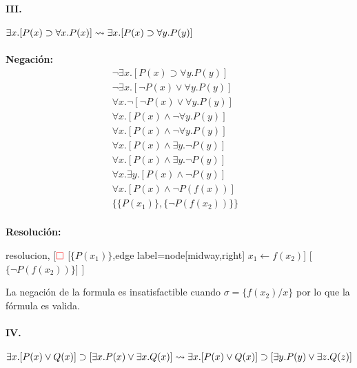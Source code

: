 \documentclass[10pt,a4paper]{article}
\begin{document}
\paragraph{III.} $\exists x. [P(x) \supset \forall x. P(x)] \underset{}{\overset{}{\leadsto}} \exists x. [P(x) \supset \forall y. P(y)]$
\begin{multicols}{2}
\textbf{Negación:}
\begin{align*}
\lnot\exists x. [P(x) \supset \forall y. P(y)] & \\[1pt]
\lnot\exists x. [\lnot P(x) \lor \forall y. P(y)] &\\[1pt]
\forall x. \lnot[\lnot P(x) \lor \forall y. P(y)] & \\[1pt]
\forall x. [P(x) \land \lnot\forall y. P(y)]  \\[1pt]
\forall x. [P(x) \land \lnot\forall y. P(y)]  \\[1pt]
\forall x. [P(x) \land \exists y. \lnot P(y)]  \\[1pt]
\forall x. [P(x) \land \exists y. \lnot P(y)]  \\[1pt]
\forall x.\exists y. [P(x) \land  \lnot P(y)]  \\[1pt]
\forall x.[P(x) \land  \lnot P(f(x))]\\[1pt]
\{\{P(x_1)\}, \{\lnot P(f(x_2))\}\}  \\[1pt]
\end{align*}

\textbf{Resolución:}
\begin{center}
	\begin{forest} resolucion,
[${\color{red}\Box}$ 
	[$\{P(x_1)\}$,edge label={node[midway,right] {$x_1\leftarrow f(x_2)$}}]
    [$\{\lnot P(f(x_2))\}$]
]
	\end{forest}
\end{center}
La negación de la formula es insatisfactible cuando $\sigma = \{ f(x_2)/x\}$ por lo que la fórmula es valida.
\end{multicols}


\paragraph{IV.} $\exists x.[P(x) \lor Q(x)] \supset [\exists x.P(x) \lor \exists x.Q(x)] \underset{}{\overset{}{\leadsto}} \exists x.[P(x) \lor Q(x)] \supset [\exists y.P(y) \lor \exists z.Q(z)]$
\end{document}
